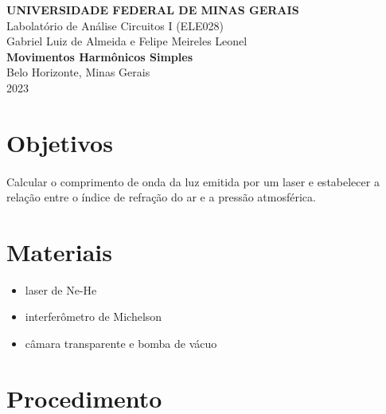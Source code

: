 \documentclass[a4paper, 12pt]{article}
\begin{document}
\begin{titlepage}
    \begin{center}

        {\normalsize \bfseries UNIVERSIDADE FEDERAL DE MINAS GERAIS}\\[2cm]
        {\normalsize Labolatório de Análise Circuitos I (ELE028)}\\[2cm]
        {\normalsize Gabriel Luiz de Almeida e Felipe Meireles Leonel}\\[8cm]
        {\large \bfseries Movimentos Harmônicos Simples}\\[10cm]
        {\normalsize Belo Horizonte, Minas Gerais\\2023}\\[4cm]

    \end{center}
\end{titlepage}

\section{Objetivos}

\paragraph{} Calcular o comprimento de onda da luz emitida por um laser e estabelecer a
relação entre o índice de refração do ar e a pressão atmosférica.

\section{Materiais}
\begin{itemize}
    \item laser de Ne-He
    \item interferômetro de Michelson
    \item câmara transparente e bomba de vácuo
\end{itemize}

\section{Procedimento}
\end{document}

